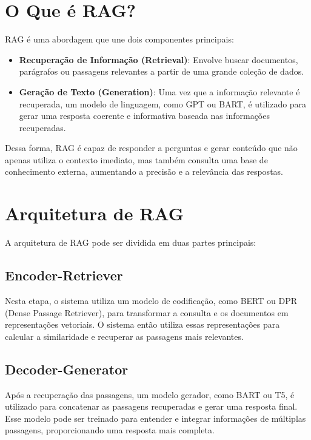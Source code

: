 \documentclass[14pt,a4paper,oneside]{book}
\begin{document}
\section{O Que é RAG?}

RAG é uma abordagem que une dois componentes principais:

\begin{itemize}
	\item \textbf{Recuperação de Informação (Retrieval)}: Envolve buscar documentos, parágrafos ou passagens relevantes a partir de uma grande coleção de dados.
	\item \textbf{Geração de Texto (Generation)}: Uma vez que a informação relevante é recuperada, um modelo de linguagem, como GPT ou BART, é utilizado para gerar uma resposta coerente e informativa baseada nas informações recuperadas.
\end{itemize}

Dessa forma, RAG é capaz de responder a perguntas e gerar conteúdo que não apenas utiliza o contexto imediato, mas também consulta uma base de conhecimento externa, aumentando a precisão e a relevância das respostas.

\section{Arquitetura de RAG}

A arquitetura de RAG pode ser dividida em duas partes principais:

\subsection{Encoder-Retriever}

Nesta etapa, o sistema utiliza um modelo de codificação, como BERT ou DPR (Dense Passage Retriever), para transformar a consulta e os documentos em representações vetoriais. O sistema então utiliza essas representações para calcular a similaridade e recuperar as passagens mais relevantes.

\subsection{Decoder-Generator}

Após a recuperação das passagens, um modelo gerador, como BART ou T5, é utilizado para concatenar as passagens recuperadas e gerar uma resposta final. Esse modelo pode ser treinado para entender e integrar informações de múltiplas passagens, proporcionando uma resposta mais completa.
\end{document}
